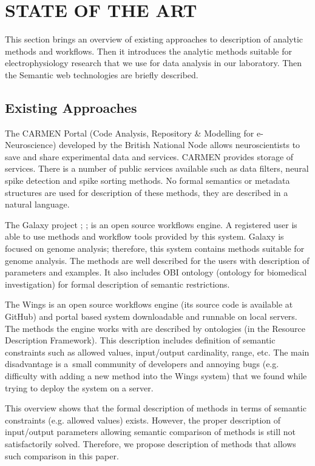 \documentclass[a4paper,twoside]{article}
\begin{document}
\section{\uppercase{State of the Art}}

\noindent This section brings an overview of existing approaches to description of analytic methods and workflows. Then it introduces the analytic methods suitable for electrophysiology research that we use for data analysis in our laboratory. Then the Semantic web technologies are briefly described.

\subsection{Existing Approaches}

The CARMEN Portal \cite{Watson07} (Code Analysis, Repository \& Modelling for e-Neuroscience) developed by the British National Node allows neuroscientists to save and share experimental data and services. CARMEN provides storage of services. There is a number of public services available such as data filters, neural spike detection and spike sorting methods. No formal semantics or metadata structures are used for description of these methods, they are described in a natural language.

The Galaxy project \cite{goecks2010galaxy}; \cite{blankenberg2010galaxy}; \cite{giardine2005galaxy} is an open source workflows engine. A registered user is able to use methods and workflow tools provided by this system. Galaxy is focused on genome analysis; therefore, this system contains methods suitable for genome analysis. The methods are well described for the users with description of parameters and examples. It also includes OBI ontology (ontology for biomedical investigation) for formal description of semantic restrictions.

The Wings is an open source workflows engine (its source code is available at GitHub) and portal based system downloadable and runnable on local servers. The methods the engine works with are described by ontologies (in the Resource Description Framework). This description includes definition of semantic constraints such as allowed values, input/output cardinality, range, etc. The main disadvantage is a~small community of developers and annoying bugs (e.g. difficulty with adding a new method into the Wings system) that we found while trying to deploy the system on a server.

This overview shows that the formal description of methods in terms of semantic constraints (e.g. allowed values) exists. However, the proper description of input/output parameters allowing semantic comparison of methods is still not satisfactorily solved. Therefore, we propose description of methods that allows such comparison in this paper.
\end{document}
